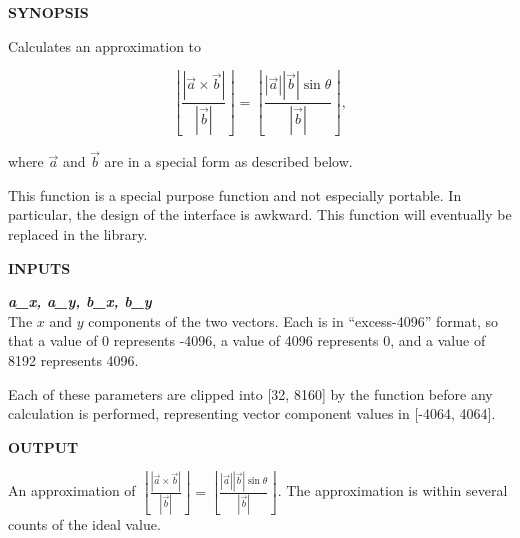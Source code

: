 \noindent\textbf{SYNOPSIS}
\begin{list}{}{\setlength{\leftmargin}{0.25in}\setlength{\topsep}{0.0in}}
\item Calculates an approximation to

      \begin{equation}
      \label{eq:cafn0:svft0:scpt0:01}
      \left\lfloor \frac{| \vec{a} \times \vec{b} |}{| \vec{b} |} \right\rfloor
      = 
      \left\lfloor \frac{| \vec{a} | | \vec{b} | \sin \theta}{| \vec{b} |} \right\rfloor ,
      \end{equation}

      where $\vec{a}$ and $\vec{b}$ are in a special form as described below.
\item This function is a special purpose function and not especially portable.  In particular, the design
      of the interface is awkward.  This function will eventually be replaced in the library.
\end{list}
\vspace{2.8ex}

\noindent\textbf{INPUTS}
\begin{list}{}{\setlength{\leftmargin}{0.5in}\setlength{\itemindent}{-0.25in}\setlength{\topsep}{0.0in}\setlength{\partopsep}{0.0in}}
\item \emph{\textbf{a\_x, a\_y, b\_x, b\_y}}\\
      The $x$ and $y$ components of the two vectors.  Each is in ``excess-4096'' format, so that a value of 0 represents -4096, a value of 4096
      represents 0, and a value of 8192 represents 4096.

      Each of these parameters are clipped into [32, 8160] by the function before any calculation
      is performed, representing vector component values in [-4064, 4064].
\end{list}
\vspace{2.8ex}

\noindent\textbf{OUTPUT}
\begin{list}{}{\setlength{\leftmargin}{0.25in}\setlength{\topsep}{0.0in}}
\item   An approximation of 
        $\left\lfloor \frac{| \vec{a} \times \vec{b} |}{| \vec{b} |}\right\rfloor
        = 
        \left\lfloor\frac{| \vec{a} | | \vec{b} | \sin \theta}{| \vec{b} |}\right\rfloor$.
        The approximation is within several counts of the ideal value.
\end{list}
\vspace{2.8ex}

